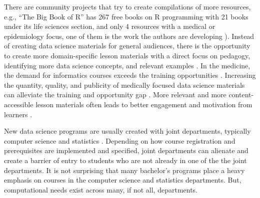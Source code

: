 \documentclass[020-persona\_validation.tex]{subfiles}
\begin{document}
    There are community projects that try to create compilations of more resources,
    e.g., ``The Big Book of R'' has 267 free books on R programming with
    21 books under its life sciences section, and
    only 4 resources with a medical or epidemiology focus,
    one of them is the work the authors are developing \cite{baruffaBigBook2021}).
    Instead of creating data science materials for general audiences,
    there is the opportunity to create more domain-specific lesson materials
    with a direct focus on pedagogy,
    identifying more data science concepts,
    and relevant examples
    \cite{krossDemocratizationDataScience2020}.
    In the medicine, the demand for informatics courses exceeds the training opportunities
    \cite{banerjeeMedicalStudentAwareness2015, americanmedicalassociationStudentInterestInformatics, americanmedicalassociationAcceleratingChangeMedical2021, americanmedicalassociationEducation}.
    Increasing the quantity, quality, and publicity of medically focused
    data science materials can alleviate the training and opportunity gap
    \cite{banerjeeMedicalStudentAwareness2015, americanmedicalassociationAcceleratingChangeMedical2021}.
    More relevant and more content-accessible lesson materials often leads to better engagement and motivation from learners
    \cite{wilson2019teaching, ambrose2010learning, Koch2016}.
    


    New data science programs are usually created with joint departments,
    typically computer science and statistics
    \cite{songBigDataData2016}.
    Depending on how course registration and prerequisites are implemented and specified,
    joint departments can alienate and create a barrier of entry to students who are not already
    in one of the the joint departments.
    It is not surprising that many bachelor's programs place a heavy emphasis on
    courses in the computer science and statistics departments.
    But, computational needs exist across many, if not all, departments.
\end{document}
